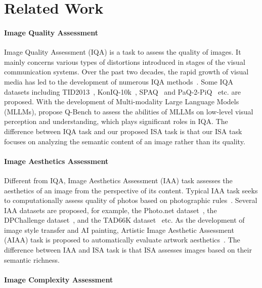 \section{Related Work}

\paragraph{Image Quality Assessment}
Image Quality Assessment (IQA) is a task to assess the quality of images.
It mainly concerns various types of distortions introduced in stages of the visual communication systems.
Over the past two decades, the rapid growth of visual media has led to the development of numerous IQA methods~\cite{zhai2020perceptual}.
Some IQA datasets including TID2013~\cite{tid2013}, KonIQ-10k~\cite{koniq10k}, SPAQ~\cite{Fang_2020_CVPR} and PaQ-2-PiQ~\cite{ying2020patches} etc. are proposed.
With the development of Multi-modality Large Language Models (MLLMs), \citet{wu2024qbench} propose Q-Bench to assess the abilities of MLLMs on low-level visual perception and understanding, which plays significant roles in IQA.
The difference between IQA task and our proposed ISA task is that our ISA task focuses on analyzing the semantic content of an image rather than its quality.


\paragraph{Image Aesthetics Assessment}
Different from IQA, Image Aesthetics Assessment (IAA) task assesses the aesthetics of an image from the perspective of its content.
Typical IAA task seeks to computationally assess quality of photos based on photographic rules~\cite{deng2017image}.
Several IAA datasets are proposed, for example, the Photo.net dataset~\cite{2011Photonet}, the DPChallenge dataset~\cite{2008DPChallenge}, and the TAD66K dataset~\cite{ijcai2022p132} etc.
As the development of image style transfer and AI painting, Artistic Image Aesthetic Assessment (AIAA) task is proposed to automatically evaluate artwork aesthetics~\cite{2015JenAesthetics, fekete2022vienna, Yi_2023_CVPR}.
The difference between IAA and ISA task is that ISA assesses images based on their semantic richness.


\paragraph{Image Complexity Assessment}

